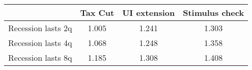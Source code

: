 \begin{tabular}{@{}lccc@{}} 
\toprule 
& Tax Cut    & UI extension    & Stimulus check    \\  \midrule 
Recession lasts 2q &1.005  & 1.241  & 1.303     \\ 
Recession lasts 4q &1.068  & 1.248  & 1.358     \\ 
Recession lasts 8q &1.185  & 1.308  & 1.408     \\ 
\end{tabular}  
